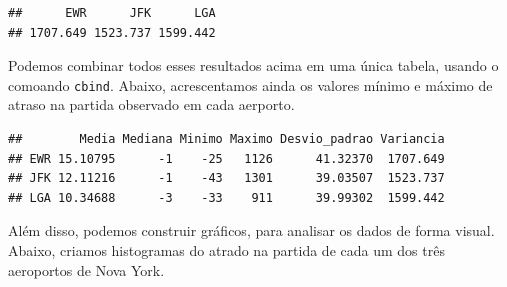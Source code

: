 \documentclass[
]{book}
\newenvironment{Shaded}{\begin{snugshade}}{\end{snugshade}}
\newcommand{\AttributeTok}[1]{\textcolor[rgb]{0.13,0.29,0.53}{#1}}
\newcommand{\ConstantTok}[1]{\textcolor[rgb]{0.56,0.35,0.01}{#1}}
\newcommand{\FunctionTok}[1]{\textcolor[rgb]{0.13,0.29,0.53}{\textbf{#1}}}
\newcommand{\NormalTok}[1]{#1}
\newcommand{\SpecialCharTok}[1]{\textcolor[rgb]{0.81,0.36,0.00}{\textbf{#1}}}
\begin{document}
\begin{verbatim}
##      EWR      JFK      LGA 
## 1707.649 1523.737 1599.442
\end{verbatim}

Podemos combinar todos esses resultados acima em uma única tabela, usando o comoando \texttt{cbind}.
Abaixo, acrescentamos ainda os valores mínimo e máximo de atraso na partida observado em cada aerporto.

\begin{Shaded}
\end{Shaded}

\begin{verbatim}
##        Media Mediana Minimo Maximo Desvio_padrao Variancia
## EWR 15.10795      -1    -25   1126      41.32370  1707.649
## JFK 12.11216      -1    -43   1301      39.03507  1523.737
## LGA 10.34688      -3    -33    911      39.99302  1599.442
\end{verbatim}

Além disso, podemos construir gráficos, para analisar os dados de forma visual.
Abaixo, criamos histogramas do atrado na partida de cada um dos três aeroportos de Nova York.
\end{document}
